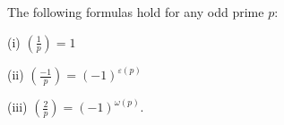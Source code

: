 The following formulas hold for any odd prime $p$:

(i) $\displaystyle\left(\frac{1}{p}\right) = 1$

(ii) $\displaystyle\left(\frac{-1}{p}\right) = (-1)^{\varepsilon(p)}$

(iii) $\displaystyle\left(\frac{2}{p}\right) = (-1)^{\omega(p)}$.
